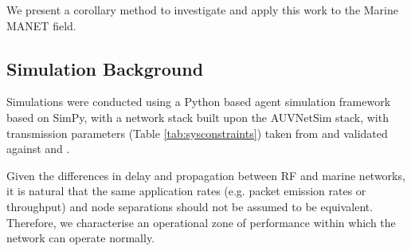 \documentclass[runningheads,a4paper]{llncs}
\begin{document}
We present a corollary method to investigate and apply this work to the Marine MANET field.

\subsection{Simulation Background}

Simulations were conducted using a Python based agent simulation framework based on SimPy\cite{Mueller2003SimPy}, with a network stack built upon the AUVNetSim stack\cite{Miquel2008}, with transmission parameters (Table \ref{tab:sysconstraints}) taken from and validated against \cite{Stojanovic2007} and \cite{Stefanov2011}.

Given the differences in delay and propagation between RF and marine networks, it is natural that the same application rates (e.g. packet emission rates or throughput) and node separations should not be assumed to be equivalent.
Therefore, we characterise an operational zone of performance within which the network can operate normally.
\end{document}
